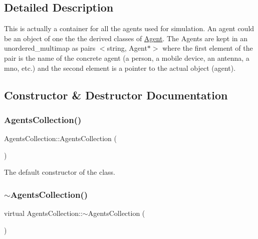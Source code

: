 \subsection{Detailed Description}
This is actually a container for all the agents used for simulation. An agent could be an object of one the the derived classes of \hyperlink{class_agent}{Agent}. The Agents are kept in an unordered\+\_\+multimap as pairs $<$string, Agent$\ast$$>$ where the first element of the pair is the name of the concrete agent (a person, a mobile device, an antenna, a mno, etc.) and the second element is a pointer to the actual object (agent). 

\subsection{Constructor \& Destructor Documentation}
\mbox{\label{class_agents_collection_a866b0ed56c0109e82bc7c839de0a3267}} 
\subsubsection{\texorpdfstring{Agents\+Collection()}{AgentsCollection()}}
{\footnotesize\ttfamily Agents\+Collection\+::\+Agents\+Collection (\begin{DoxyParamCaption}{ }\end{DoxyParamCaption})}

The default constructor of the class. \mbox{\label{class_agents_collection_a8a58eb1f8a45cc4d1c0e04dd912dbae0}} 
\subsubsection{\texorpdfstring{$\sim$\+Agents\+Collection()}{~AgentsCollection()}}
{\footnotesize\ttfamily virtual Agents\+Collection\+::$\sim$\+Agents\+Collection (\begin{DoxyParamCaption}{ }\end{DoxyParamCaption})\hspace{0.3cm}{\ttfamily [virtual]}}

